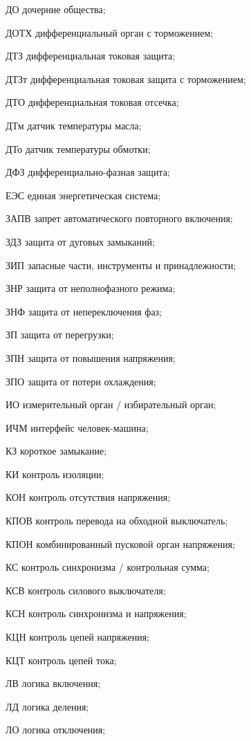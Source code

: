 \begin{list}{}
\item[ДО] дочерние общества;
\item[ДОТХ] дифференциальный орган с торможением;
\item[ДТЗ] дифференциальная токовая защита;
\item[ДТЗт] дифференциальная токовая защита с торможением;
\item[ДТО] дифференциальная токовая отсечка;
\item[ДТм] датчик температуры масла;
\item[ДТо] датчик температуры обмотки;
\item[ДФЗ] дифференциально-фазная защита;
\item[ЕЭС] единая энергетическая система;
\item[ЗАПВ] запрет автоматического повторного включения;
\item[ЗДЗ] защита от дуговых замыканий;
\item[ЗИП] запасные части, инструменты и принадлежности;
\item[ЗНР] защита от неполнофазного режима;
\item[ЗНФ] защита от непереключения фаз;
\item[ЗП] защита от перегрузки;
\item[ЗПН] защита от повышения напряжения;
\item[ЗПО] защита от потери охлаждения;
\item[ИО] измерительный орган / избирательный орган;
\item[ИЧМ] интерфейс человек-машина;
\item[КЗ] короткое замыкание;
\item[КИ] контроль изоляции;
\item[КОН] контроль отсутствия напряжения;
\item[КПОВ] контроль перевода на обходной выключатель;
\item[КПОН] комбинированный пусковой орган напряжения;
\item[КС] контроль синхронизма / контрольная сумма;
\item[КСВ] контроль силового выключателя;
\item[КСН] контроль синхронизма и напряжения;
\item[КЦН] контроль цепей напряжения;
\item[КЦТ] контроль цепей тока;
\item[ЛВ] логика включения;
\item[ЛД] логика деления;
\item[ЛО] логика отключения;

\end{list}
